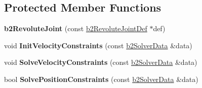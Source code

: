 \subsection*{Protected Member Functions}
\begin{DoxyCompactItemize}
\item 
\hypertarget{classb2_revolute_joint_a2571c1438e909fb3518de6f88bb29e01}{{\bfseries b2\-Revolute\-Joint} (const \hyperlink{structb2_revolute_joint_def}{b2\-Revolute\-Joint\-Def} $\ast$def)}\label{classb2_revolute_joint_a2571c1438e909fb3518de6f88bb29e01}

\item 
\hypertarget{classb2_revolute_joint_af8f5a4b3fac025f0a0e5474b81667dfb}{void {\bfseries Init\-Velocity\-Constraints} (const \hyperlink{structb2_solver_data}{b2\-Solver\-Data} \&data)}\label{classb2_revolute_joint_af8f5a4b3fac025f0a0e5474b81667dfb}

\item 
\hypertarget{classb2_revolute_joint_a9971ccf2570c9bf8c2e816aa5c0db05a}{void {\bfseries Solve\-Velocity\-Constraints} (const \hyperlink{structb2_solver_data}{b2\-Solver\-Data} \&data)}\label{classb2_revolute_joint_a9971ccf2570c9bf8c2e816aa5c0db05a}

\item 
\hypertarget{classb2_revolute_joint_ad07e86dedb1f42c7d78129a65c0184fc}{bool {\bfseries Solve\-Position\-Constraints} (const \hyperlink{structb2_solver_data}{b2\-Solver\-Data} \&data)}\label{classb2_revolute_joint_ad07e86dedb1f42c7d78129a65c0184fc}

\end{DoxyCompactItemize}
